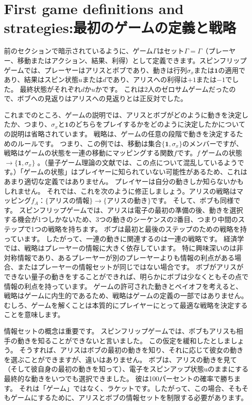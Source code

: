 \section{First game definitions and strategies:最初のゲームの定義と戦略}

前のセクションで暗示されているように、ゲーム$\Gamma$はセット$\Gamma=\Gamma$（プレーヤー、移動またはアクション、結果、利得）として定義できます。スピンフリップゲームでは、プレーヤーはアリスとボブであり、動きは行列$\sigma_x$または$\mathbf{1}$の適用であり、結果はスピン状態$u$または$d$であり、アリスへの利得は$+1$または$-1$でした。 最終状態がそれぞれ$d$か$u$かです。 これは$2$人のゼロサムゲームだったので、ボブへの見返りはアリスへの見返りとは正反対でした。

これまでのところ、ゲームの説明では、アリスとボブがどのように動きを決定したか、つまり、$\sigma_x$と$\mathbf{1}$のどちらをプレイするかをどのように決定したかについての説明は省略されています。
戦略は、ゲームの任意の段階で動きを決定するためのルールです。 つまり、この例では、移動は集合$\{ \mathbf{1}, \sigma_x \}$のメンバーですが、戦略はゲームの状態を一連の移動にマッピングする関数$f$です。$f \:$ゲームの状態$\rightarrow \{ \mathbf{1}, \sigma_x \}$ 。（量子ゲーム理論の文献では、この点について混乱しているようです。）「ゲームの状態」はプレイヤーに知られていない可能性があるため、これはあまり適切な定義ではありません。 プレイヤーは自分の動きしか知らないかもしれません。
それでは、これを次のように修正しましょう。アリスの戦略はマッピング$f_A$：$\{アリスの情報 \} \rightarrow \{アリスの動き\}$です。
そして、ボブも同様です。 スピンフリップゲームでは、アリスは電子の最初の準備の後、動きを選択する機会が1つしかないため、3つの動きのシーケンスの2番目、つまり中間のステップで1つの戦略を持ちます。 ボブは最初と最後のステップのための戦略を持っています。
したがって、一連の動きに関連するのは一連の戦略です。 経済学では、戦略はプレーヤーの情報に大きく依存しています。
特に興味深いのは非対称情報であり、あるプレーヤーが別のプレーヤーよりも情報の利点がある場合、またはプレーヤーの情報セットが同じではない場合です。
ボブがアリスができない量子の動きをすることができれば、明らかにボブは少なくともその点で情報の利点を持っています。
ゲームの許可された動きとペイオフを考えると、戦略はゲームに内生的であるため、戦略はゲームの定義の一部ではありません。 むしろ、ゲームを解くことは本質的にプレイヤーにとって最適な戦略を決定することを意味します。

情報セットの概念は重要です。 スピンフリップゲームでは、ボブもアリスも相手の動きを知ることができないと言いました。
この仮定を緩和したとしましょう。 そうすれば、アリスはボブの最初の動きを知り、それに応じて彼女の動きを選ぶことができますが、違いはありません。
ボブは、アリスの動きを見て（そして彼自身の最初の動きを知って）、電子をスピンアップ状態uのままにする最終的な動きをいつでも選択できました。 彼は100パーセントの確率で勝ちます。 それは「ゲーム」ではなく、ラケットです。したがって、この場合、そもそもゲームにするために、アリスとボブの情報セットを制限する必要があります。

